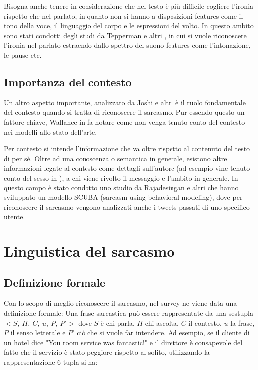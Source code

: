 \documentclass[oneside]{book}
\begin{document}
Bisogna anche tenere in considerazione che nel testo è più difficile cogliere l'ironia rispetto che nel parlato, in quanto non si hanno a disposizioni features come il tono della voce, il linguaggio del corpo e le espressioni del volto. In questo ambito sono stati condotti degli studi da Tepperman e altri \cite{audio-sarcasm}, in cui si vuole riconoscere l'ironia nel parlato estraendo dallo spettro del suono features come l'intonazione, le pause etc.

\subsection{Importanza del contesto}
Un altro aspetto importante, analizzato da Joshi e altri \cite{survey5} è il ruolo fondamentale del contesto quando si tratta di riconoscere il sarcasmo. Pur essendo questo un fattore chiave, Wallance in \cite{survey4} fa notare come non venga tenuto conto del contesto nei modelli allo stato dell'arte.

Per contesto si intende l'informazione che va oltre rispetto al contenuto del testo di per sè. Oltre ad una conoscenza o semantica in generale, esistono altre informazioni legate al contesto come dettagli sull'autore (ad esempio vine tenuto conto del sesso in \cite{audio-sarcasm}), a chi viene rivolto il messaggio e l'ambito in generale. In questo campo è stato condotto uno studio da Rajadesingan e altri \cite{scuba} che hanno sviluppato un modello SCUBA (sarcasm using behavioral modeling), dove per riconoscere il sarcasmo vengono analizzati anche i tweets passati di uno specifico utente.

\section{Linguistica del sarcasmo}
\subsection{Definizione formale}
Con lo scopo di meglio riconoscere il sarcasmo, nel survey \cite{survey2} ne viene data una definizione formale:
Una frase sarcastica può essere rappresentate da una sestupla $<S,\ H,\ C,\ u,\ P,\ P'>$ dove $S$ è chi parla, $H$ chi ascolta, $C$ il contesto, $u$ la frase, $P$ il senso letterale e $P'$ ciò che si vuole far intendere. Ad esempio, se il cliente di un hotel dice "You room service was fantastic!" e il direttore è consapevole del fatto che il servizio è stato peggiore rispetto al solito, utilizzando la rappresentazione 6-tupla si ha:
\end{document}
